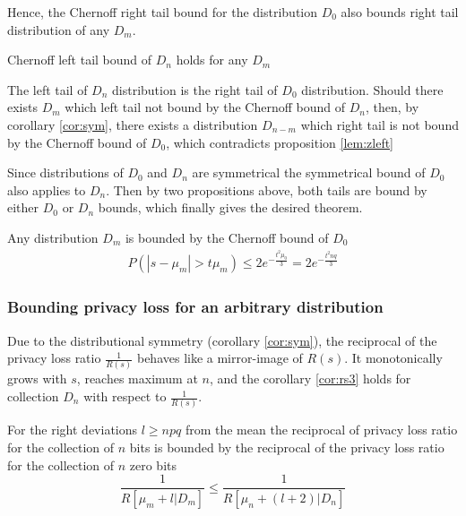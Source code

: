 \documentclass[11pt]{article}
\begin{document}
\begin{prop}
\begin{pf}
 Hence,  the Chernoff right tail bound for the distribution $D_0$ also bounds right tail distribution of any $D_m$.
\end{pf}
\end{prop}

\begin{prop} \label{lem:zright}
Chernoff left tail bound of $D_n$ holds for any $D_m$
\begin{pf}
 The left tail of $D_n$ distribution is the right tail of $D_0$ distribution.  Should there exists $D_m$ which left tail not bound by the Chernoff bound of $D_n$, then, by corollary \ref{cor:sym},  there exists a distribution $D_{n-m}$ which right tail is not bound by the Chernoff bound of $D_0$, which contradicts proposition \ref{lem:zleft}
\end{pf}
\end{prop}

Since distributions of $D_0$ and $D_n$ are symmetrical the symmetrical bound of $D_0$ also applies to $D_n$.  Then by two propositions above, both tails are bound by either $D_0$ or $D_n$ bounds, which finally gives the desired theorem. 

\begin{prop} \label{lem:bound}
Any distribution $D_m$ is bounded by the Chernoff bound of $D_0$
 \begin{align}
P(|s - \mu_m| > t\mu_m) \le 2 e^{- \frac{t^2\mu_0}{3}}  = 2 e^{- \frac{t^2nq}{3}} 
\end{align}
\end{prop}

\subsubsection{Bounding privacy loss for an arbitrary distribution}

Due to the distributional symmetry (corollary \ref{cor:sym}), the reciprocal of the privacy loss ratio $\frac{1}{R(s)}$ behaves like a mirror-image of $R(s)$.  It monotonically grows with $s$, reaches maximum at $n$, and the corollary \ref{cor:rs3} holds for collection $D_n$ with respect to $\frac{1}{R(s)}$.  
\begin{cor}
For the right deviations $l \ge npq$ from the mean the reciprocal of privacy loss ratio for the collection of $n$ bits is bounded by the reciprocal of the privacy loss ratio for the collection of $n$ zero bits
\[ \frac{1}{R[\mu_m + l|D_m]} \le \frac{1}{R[\mu_n + (l+2)|D_n]} \]
\end{cor}
\end{document}
